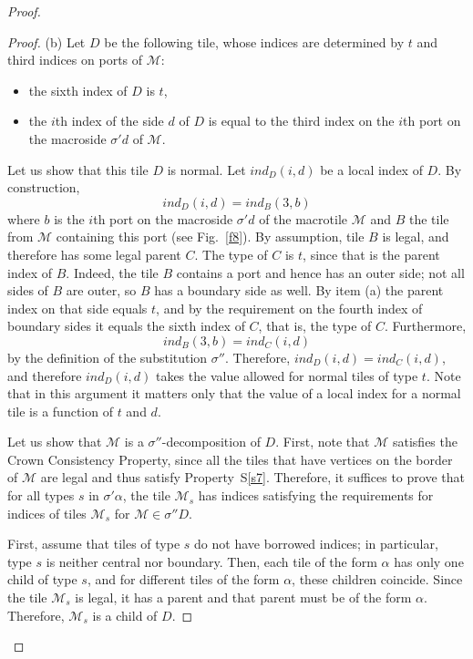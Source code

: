 \documentclass[10pt,a4paper]{amsart}
\newcommand{\ind}{\textit{ind}}
\begin{document}
\begin{proof}
\begin{proof}
(b) Let $D$ be the following tile, whose indices are determined
by $t$ and third  indices on ports of  $\mathcal M$:
\begin{itemize}
\item the sixth index of $D$ is $t$,
\item the $i$th index of the side $d$ of $D$ is equal to the third index on the $i$th 
port on the macroside $\sigma'd$ of $\mathcal M$.
\end{itemize}


Let us show that this tile $D$ is normal. Let $\ind_D(i,d)$ be a local
index of $D$. 
By construction, 
$$
\ind_D(i,d)=\ind_B(3,b)
$$
where $b$ is the $i$th port
on the macroside $\sigma'd$ of the macrotile $\mathcal M$ and 
$B$ the tile from $\mathcal M$ containing this port (see Fig.~\ref{f8}). 
By assumption,
tile $B$ is legal, and therefore has some legal parent $C$.
The type of $C$ is $t$, since that is the parent index of $B$. Indeed, the tile $B$ contains a
port and hence has an outer side; not all sides of $B$ are outer, so $B$ has a boundary side as
well. By item (a) the parent index on that side equals $t$, and by the requirement on the fourth
index of boundary sides it equals the sixth index of $C$, that is, the type of $C$.
Furthermore,
$$
\ind_B(3,b)=\ind_C(i,d)
$$
by the definition of the substitution $\sigma''$.
Therefore, $\ind_D(i,d)=\ind_C(i,d)$,
and therefore $\ind_D(i,d)$ takes the value allowed for normal tiles of type $t$.
Note that in this argument it matters only that the value of a local index for a normal 
tile is a function of $t$ and $d$.

Let us show
that $\mathcal M$ is a $\sigma''$-decomposition of $D$.
First, note that $\mathcal M$ satisfies the Crown Consistency Property,
since all the tiles that have vertices on the border of $\mathcal M$ are  legal and 
thus satisfy Property~S\ref{s7}. Therefore,
it suffices to prove that
for all types $s$ in $\sigma'\alpha$, the tile $\mathcal M_s$
has indices satisfying the requirements for indices of tiles
$\mathcal M_s$ for $\mathcal M\in\sigma''D$.

First, assume that tiles of type $s$ do not have borrowed indices; in particular, type $s$ is neither central nor boundary.
Then, each tile of the form $\alpha$
has only one child of type $s$, and for different tiles of the form $\alpha$,
these children coincide.
Since the tile $\mathcal M_s$ is legal, it has a parent and that parent must be of the form $\alpha$.
Therefore, $\mathcal M_s$ is a child of $D$.


\end{proof}
\end{proof}
\end{document}

